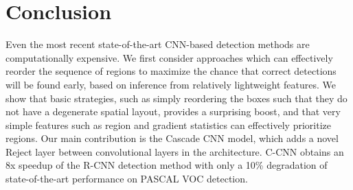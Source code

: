 \section{Conclusion}

Even the most recent state-of-the-art CNN-based detection methods are computationally expensive.
We first consider approaches which can effectively reorder the sequence of regions to maximize the chance that correct detections will be found early, based on inference from relatively lightweight features.
We show that basic strategies, such as simply reordering the boxes such that they do not have a degenerate spatial layout, provides a surprising boost, and that very simple features such as region and gradient statistics can effectively prioritize regions.
Our main contribution is the Cascade CNN model, which adds a novel Reject layer between convolutional layers in the architecture.
C-CNN obtains an 8x speedup of the R-CNN detection method with only a 10\% degradation of state-of-the-art performance on PASCAL VOC detection.
